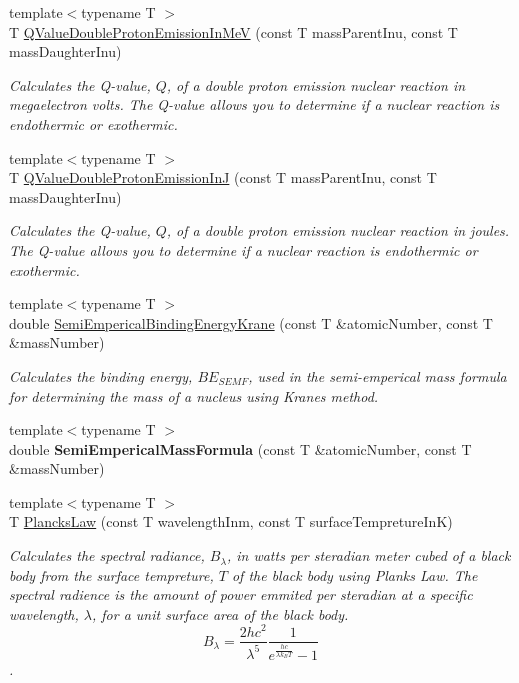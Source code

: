 \begin{DoxyCompactItemize}
{\footnotesize template$<$typename T $>$ }\\T \mbox{\hyperlink{group___e_g_x_phys-_q_value-_proton_emission_ga61d07711da603f2f4426fbb3f271fc34}{Q\+Value\+Double\+Proton\+Emission\+In\+MeV}} (const T mass\+Parent\+Inu, const T mass\+Daughter\+Inu)
\begin{DoxyCompactList}\small\item\em Calculates the Q-\/value, $Q$, of a double proton emission nuclear reaction in megaelectron volts. The Q-\/value allows you to determine if a nuclear reaction is endothermic or exothermic. \end{DoxyCompactList}\item 
{\footnotesize template$<$typename T $>$ }\\T \mbox{\hyperlink{group___e_g_x_phys-_q_value-_proton_emission_gab8979dd25aeac115834a4a8b233fec6f}{Q\+Value\+Double\+Proton\+Emission\+InJ}} (const T mass\+Parent\+Inu, const T mass\+Daughter\+Inu)
\begin{DoxyCompactList}\small\item\em Calculates the Q-\/value, $Q$, of a double proton emission nuclear reaction in joules. The Q-\/value allows you to determine if a nuclear reaction is endothermic or exothermic. \end{DoxyCompactList}\item 
{\footnotesize template$<$typename T $>$ }\\double \mbox{\hyperlink{group___e_g_x_phys-_semi_empirical_mass_formula_ga99c5a87be2c76d3fa4852654c3fd59a9}{Semi\+Emperical\+Binding\+Energy\+Krane}} (const T \&atomic\+Number, const T \&mass\+Number)
\begin{DoxyCompactList}\small\item\em Calculates the binding energy, $BE_{SEMF}$, used in the semi-\/emperical mass formula for determining the mass of a nucleus using Krane\textquotesingle{}s method. \end{DoxyCompactList}\item 
{\footnotesize template$<$typename T $>$ }\\double {\bfseries Semi\+Emperical\+Mass\+Formula} (const T \&atomic\+Number, const T \&mass\+Number)
\item 
{\footnotesize template$<$typename T $>$ }\\T \mbox{\hyperlink{group___e_g_x_phys-_electrodynamics-_black_body-_plancks_law_ga44d8dc3e072ffc7d860cd8f07463f091}{Plancks\+Law}} (const T wavelength\+Inm, const T surface\+Tempreture\+InK)
\begin{DoxyCompactList}\small\item\em Calculates the spectral radiance, $B_{\lambda}$, in watts per steradian meter cubed of a black body from the surface tempreture, $T$ of the black body using Plank\textquotesingle{}s Law. The spectral radience is the amount of power emmited per steradian at a specific wavelength, $\lambda$, for a unit surface area of the black body. \[ B_{\lambda} = \dfrac{2 h c^2}{\lambda^5} \dfrac{1}{e^{\frac{hc}{\lambda k_B T}} - 1} \]. \end{DoxyCompactList}\item 

\end{DoxyCompactItemize}
